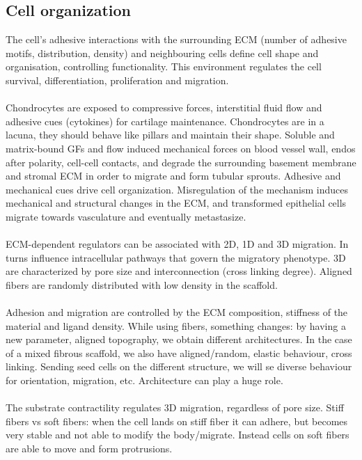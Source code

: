 \subsection{Cell organization}
The cell's adhesive interactions with the surrounding ECM (number of adhesive motifs, distribution, density) and neighbouring cells define cell shape and organisation, controlling functionality. This environment regulates the cell survival, differentiation, proliferation and migration.
\\
\\
\noindent
Chondrocytes are exposed to compressive forces, interstitial fluid flow and adhesive cues (cytokines) for cartilage maintenance. Chondrocytes are in a lacuna, they should behave like pillars and maintain their shape.
Soluble and matrix-bound GFs and flow induced mechanical forces on blood vessel wall, endos after polarity, cell-cell contacts, and degrade the surrounding basement membrane and stromal ECM in order to migrate and form tubular sprouts. 
Adhesive and mechanical cues drive cell organization. Misregulation of the mechanism induces mechanical and structural changes in the ECM, and transformed epithelial cells migrate towards vasculature and eventually metastasize.
\\
\\
\noindent
ECM-dependent regulators can be associated with 2D, 1D and 3D migration. In turns influence intracellular pathways that govern the migratory phenotype. 3D are characterized by pore size and interconnection (cross linking degree). Aligned fibers are randomly distributed with low density in the scaffold.
\\
\\
\noindent
Adhesion and migration are controlled by the ECM composition, stiffness of the material and ligand density. While using fibers, something changes: by having a new parameter, aligned topography, we obtain different architectures. In the case of a mixed fibrous scaffold, we also have aligned/random, elastic behaviour, cross linking. Sending seed cells on the different structure, we will se diverse behaviour for orientation, migration, etc. Architecture can play a huge role.
\\
\\
\noindent
The substrate contractility regulates 3D migration, regardless of pore size. Stiff fibers vs soft fibers: when the cell lands on stiff fiber it can adhere, but becomes very stable and not able to modify the body/migrate. Instead cells on soft fibers are able to move and form protrusions.
